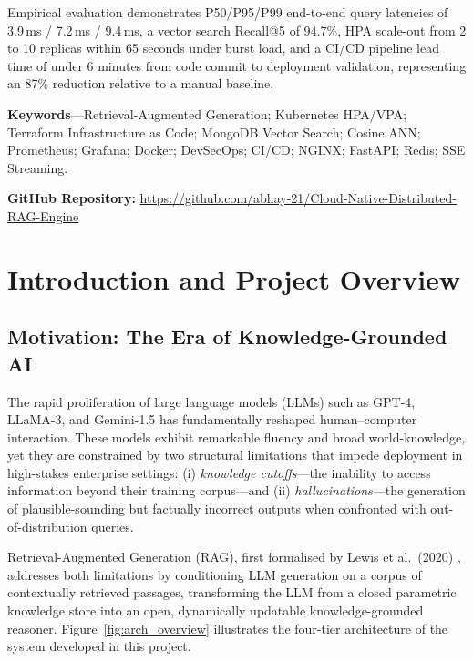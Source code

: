 \documentclass[12pt,a4paper]{report}
\begin{document}
Empirical evaluation demonstrates P50/P95/P99 end-to-end query latencies of
3.9\,ms / 7.2\,ms / 9.4\,ms, a vector search Recall@5 of 94.7\%, HPA
scale-out from 2 to 10 replicas within 65 seconds under burst load, and a
CI/CD pipeline lead time of under 6 minutes from code commit to deployment
validation, representing an 87\% reduction relative to a manual baseline.

\vspace{0.5cm}
\noindent\textbf{Keywords}---Retrieval-Augmented Generation; Kubernetes HPA/VPA;
Terraform Infrastructure as Code; MongoDB Vector Search; Cosine ANN; Prometheus;
Grafana; Docker; DevSecOps; CI/CD; NGINX; FastAPI; Redis; SSE Streaming.

\vspace{0.5cm}
\noindent\textbf{GitHub Repository:}
\href{https://github.com/abhay-21/Cloud-Native-Distributed-RAG-Engine}{https://github.com/abhay-21/Cloud-Native-Distributed-RAG-Engine}
\newpage

\tableofcontents

\listoffigures

\listoftables

\newpage



\chapter{Introduction and Project Overview}

\section{Motivation: The Era of Knowledge-Grounded AI}

The rapid proliferation of large language models (LLMs) such as GPT-4, LLaMA-3,
and Gemini-1.5 has fundamentally reshaped human--computer interaction. These
models exhibit remarkable fluency and broad world-knowledge, yet they are
constrained by two structural limitations that impede deployment in high-stakes
enterprise settings: (i) \emph{knowledge cutoffs}---the inability to access
information beyond their training corpus---and (ii) \emph{hallucinations}---the
generation of plausible-sounding but factually incorrect outputs when confronted
with out-of-distribution queries.

Retrieval-Augmented Generation (RAG), first formalised by Lewis et al.\ (2020)
\cite{lewis2020rag}, addresses both limitations by conditioning LLM generation
on a corpus of contextually retrieved passages, transforming the LLM from a
closed parametric knowledge store into an open, dynamically updatable
knowledge-grounded reasoner. Figure~\ref{fig:arch_overview} illustrates the
four-tier architecture of the system developed in this project.
\end{document}

